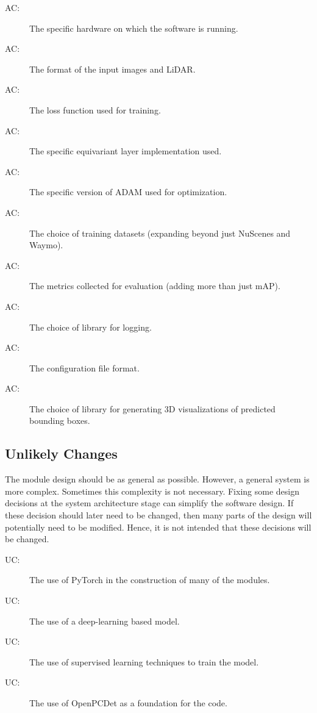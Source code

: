 \documentclass[12pt, titlepage]{article}
\newcounter{acnum}
\newcommand{\actheacnum}{AC\theacnum}
\newcounter{ucnum}
\newcommand{\uctheucnum}{UC\theucnum}
\begin{document}
\begin{description}
\item[ \actheacnum \label{acHardware}:] The specific
  hardware on which the software is running.
\item[ \actheacnum \label{acInput}:] The format of the
  input images and LiDAR.
\item[ \actheacnum \label{acLoss}:] The loss function used for training.
\item[ \actheacnum \label{acEQLayers}:] The specific equivariant layer implementation
  used.
\item[ \actheacnum \label{acOptim}:] The specific version of ADAM used for optimization.
\item[ \actheacnum \label{acData}:] The choice of training datasets (expanding beyond just NuScenes and Waymo).
\item[ \actheacnum \label{acMetric}:] The metrics collected for evaluation (adding more than just mAP).
\item[ \actheacnum \label{acLogging}:] The choice of library for logging. 
\item[ \actheacnum \label{acConfig}:] The configuration file format.
\item[ \actheacnum \label{acPlots}:] The choice of library for generating 3D visualizations of predicted bounding boxes.    
\end{description}

\subsection{Unlikely Changes} \label{SecUchange}

The module design should be as general as possible. However, a general system is
more complex. Sometimes this complexity is not necessary. Fixing some design
decisions at the system architecture stage can simplify the software design. If
these decision should later need to be changed, then many parts of the design
will potentially need to be modified. Hence, it is not intended that these
decisions will be changed.

\begin{description}
\item[ \uctheucnum \label{ucPyTorch}:] The use of PyTorch in the construction of many of the modules.
\item[ \uctheucnum \label{ucDL}:] The use of a deep-learning based model.
\item[ \uctheucnum \label{ucSL}:] The use of supervised learning techniques to train the model. 
\item[ \uctheucnum \label{ucOpenPCDet}:] The use of OpenPCDet as a foundation for the code.
\end{description}
\end{document}
